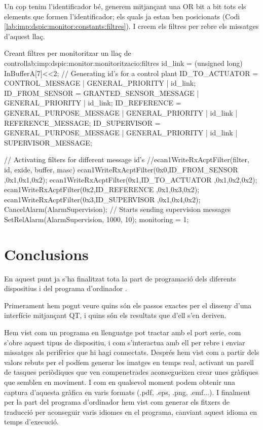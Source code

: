 Un cop tenim l'identificador bé, generem mitjançant una OR bit a bit tots els elements que formen l'identificador; els quals ja estan ben posicionats (Codi \ref{lab:imp:dspic:monitor:constants:filtres}). I creem els filtres per rebre els missatges d'aquest llaç.

\begin{code_c}{Creant filtres per monitoritzar un llaç de control}{lab:imp:dspic:monitor:monitoritzacio:filtres}
id_link = (unsigned long) InBufferA[7]<<2;
// Generating id's for a control plant
ID_TO_ACTUATOR 		= CONTROL_MESSAGE 			| GENERAL_PRIORITY | id_link;
ID_FROM_SENSOR		= GRANTED_SENSOR_MESSAGE 	| GENERAL_PRIORITY | id_link;
ID_REFERENCE		= GENERAL_PURPOSE_MESSAGE 	| GENERAL_PRIORITY | id_link | REFERENCE_MESSAGE;
ID_SUPERVISOR		= GENERAL_PURPOSE_MESSAGE 	| GENERAL_PRIORITY | id_link | SUPERVISOR_MESSAGE;

// Activating filters for different message id's
//ecan1WriteRxAcptFilter(filter, id, exide, buffer, masc)
ecan1WriteRxAcptFilter(0x0,ID_FROM_SENSOR	,0x1,0x1,0x2);
ecan1WriteRxAcptFilter(0x1,ID_TO_ACTUATOR	,0x1,0x2,0x2);
ecan1WriteRxAcptFilter(0x2,ID_REFERENCE		,0x1,0x3,0x2);
ecan1WriteRxAcptFilter(0x3,ID_SUPERVISOR	,0x1,0x4,0x2);
CancelAlarm(AlarmSupervision);
// Starts sending supervision messages
SetRelAlarm(AlarmSupervision, 1000, 10);
monitoring = 1;
\end{code_c}


\section{Conclusions}\label{cap:imp:conc}

En aquest punt ja s'ha finalitzat tota la part de programació dels diferents dispositius i del programa d'ordinador \DCSMonitor. 

Primerament hem pogut veure quins són els passos exactes per el disseny d'una interfície mitjançant QT, i quins són els resultats que d'ell s'en deriven.

Hem vist com un programa en llenguatge \Python pot tractar amb el port serie, com s'obre aquest tipus de dispositiu, i com s'interactua amb ell per rebre i enviar missatges als perifèrics que hi hagi connectats. Després hem vist com a partir dels valors rebuts per el \Monitor podíem generar les imatges en temps real, activant un parell de tasques periòdiques que ven compenetrades aconsegueixen crear unes gràfiques que semblen en moviment. I com en qualsevol moment podem obtenir una captura d'aquesta gràfica en varis formats (.pdf, .eps, .png, .emf...). I finalment per la part del programa d'ordinador hem vist com generar els fitxers de traducció per aconseguir varis idiomes en el programa, canviant aquest idioma en temps d'execució.

